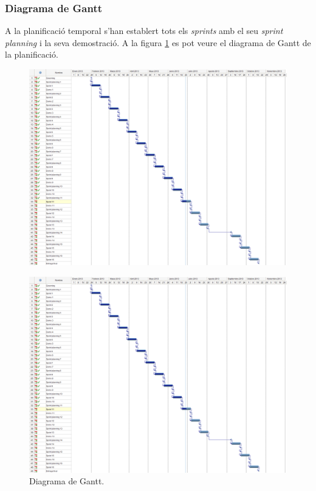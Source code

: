\subsubsection{Diagrama de Gantt}

A la planificació temporal s'han establert tots els \textit{sprints} amb el seu \textit{sprint planning} i la seva demostració. A la figura \ref{fig:diagrama_gantt} es pot veure el diagrama de Gantt de la planificació. 

\begin{figure}[ht]
    \centering
    \includegraphics*[scale=0.65, viewport=5 0 680 950]{GestioProjecte/Planificacio/diagrama_gantt_gran.png}
\end{figure}

\begin{figure}[ht]
    \centering
    \includegraphics*[scale=0.65, viewport=680 0 1300 950]{GestioProjecte/Planificacio/diagrama_gantt_gran.png}
    \caption{Diagrama de Gantt.}
    \label{fig:diagrama_gantt}
\end{figure}

\FloatBarrier